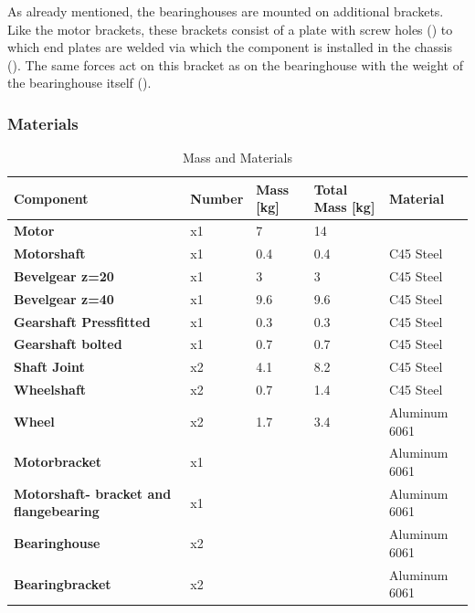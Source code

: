 
As already mentioned, the bearinghouses are mounted on additional brackets. Like the motor brackets, these brackets consist of a plate with screw holes () to which end plates are welded via which the component is installed in the chassis (). The same forces act on this bracket as on the bearinghouse with the weight of the bearinghouse itself ().


\subsubsection{Materials}
\begin{table}[H]
\centering
\begin{adjustbox}{width=\textwidth}
\begin{tabular}{|>{\bfseries}m{3cm}|m{2cm}|m{2.3cm}|m{2.3cm}|m{2.5cm}|}
\hline
Component & Number & Mass [kg] & Total Mass [kg] & Material \\
\hline
Motor & x1 & 7 & 14 & \\
\hline
Motorshaft & x1 & 0.4 & 0.4 & C45 Steel \\
\hline
Bevelgear z=20 & x1 & 3 & 3 & C45 Steel \\
\hline
Bevelgear z=40 & x1 & 9.6 & 9.6 & C45 Steel \\
\hline
Gearshaft Pressfitted & x1 & 0.3 & 0.3 & C45 Steel \\
\hline
Gearshaft bolted & x1 & 0.7 & 0.7 & C45 Steel \\
\hline
Shaft Joint & x2 & 4.1 & 8.2 & C45 Steel \\
\hline
Wheelshaft & x2 & 0.7 & 1.4 & C45 Steel \\
\hline
Wheel & x2 & 1.7 & 3.4 & Aluminum 6061 \\
\hline
Motorbracket & x1 &  &  & Aluminum 6061 \\
\hline
Motorshaft- bracket and flangebearing & x1 &  &  & Aluminum 6061 \\
\hline
Bearinghouse & x2 &  &  & Aluminum 6061 \\
\hline
Bearingbracket & x2 &  &  & Aluminum 6061 \\
\hline
\end{tabular}
\end{adjustbox}
\caption{Mass and Materials}
\label{table:Materials}
\end{table}

